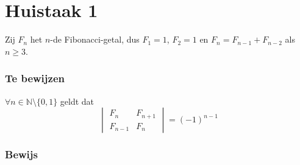 \documentclass[lineaire_algebra_oplossingen.tex]{subfiles}
\begin{document}
\part{Huistaak 1}

Zij $F_{n}$ het $n$-de Fibonacci-getal, dus $F_{1}=1$, $F_{2}=1$ en $F_{n}=F_{n-1}+F_{n-2}$ als $n \ge 3$.
\section*{Te bewijzen}
$\forall n \in \mathbb{N}\setminus\{0,1\}$ geldt dat
\[
\begin{vmatrix}
F_{n}   & F_{n+1}\\
F_{n-1} & F_{n}
\end{vmatrix}
=
(-1)^{n-1}
\]
\section*{Bewijs}
\end{document}
